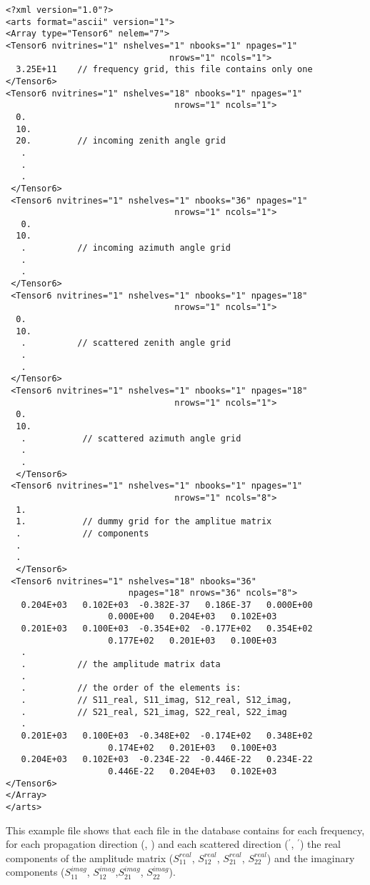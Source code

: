 \begin{verbatim}
<?xml version="1.0"?>
<arts format="ascii" version="1">
<Array type="Tensor6" nelem="7">
<Tensor6 nvitrines="1" nshelves="1" nbooks="1" npages="1"
                                nrows="1" ncols="1">
  3.25E+11    // frequency grid, this file contains only one
</Tensor6>
<Tensor6 nvitrines="1" nshelves="18" nbooks="1" npages="1" 
                                 nrows="1" ncols="1">
  0.          
  10.
  20.         // incoming zenith angle grid
   .
   .
   .
 </Tensor6>
 <Tensor6 nvitrines="1" nshelves="1" nbooks="36" npages="1"
                                 nrows="1" ncols="1">
   0.
  10.
   .          // incoming azimuth angle grid   
   .
   .
 </Tensor6>
 <Tensor6 nvitrines="1" nshelves="1" nbooks="1" npages="18"
                                 nrows="1" ncols="1">
  0.
  10.
   .          // scattered zenith angle grid
   .
   .
 </Tensor6>
 <Tensor6 nvitrines="1" nshelves="1" nbooks="1" npages="18"
                                 nrows="1" ncols="1">
  0.
  10.
   .           // scattered azimuth angle grid
   .
   .
  </Tensor6>
 <Tensor6 nvitrines="1" nshelves="1" nbooks="1" npages="1"
                                 nrows="1" ncols="8"> 
  1.
  1.           // dummy grid for the amplitue matrix 
  .            // components
  .
  .
  </Tensor6>
 <Tensor6 nvitrines="1" nshelves="18" nbooks="36" 
                        npages="18" nrows="36" ncols="8">
   0.204E+03   0.102E+03  -0.382E-37   0.186E-37   0.000E+00  
                    0.000E+00   0.204E+03   0.102E+03
   0.201E+03   0.100E+03  -0.354E+02  -0.177E+02   0.354E+02 
                    0.177E+02   0.201E+03   0.100E+03
   .
   .          // the amplitude matrix data 
   .    
   .          // the order of the elements is:
   .          // S11_real, S11_imag, S12_real, S12_imag, 
   .          // S21_real, S21_imag, S22_real, S22_imag    
   .
   0.201E+03   0.100E+03  -0.348E+02  -0.174E+02   0.348E+02  
                    0.174E+02   0.201E+03   0.100E+03
   0.204E+03   0.102E+03  -0.234E-22  -0.446E-22   0.234E-22   
                    0.446E-22   0.204E+03   0.102E+03
</Tensor6>
</Array>
</arts>
\end{verbatim}

This example file shows that each file in the database contains
for each frequency, for each propagation
direction (\ScaZa, \ScaAa) and each scattered direction
 (\ScaZa$^\prime$, \ScaAa$^\prime$) the real
components of the amplitude matrix ($S^{real}_{11}$, $S^{real}_{12}$,
$S^{real}_{21}$, $S^{real}_{22}$) and the imaginary components
($S^{imag}_{11}$, $S^{imag}_{12}$,$S^{imag}_{21}$, $S^{imag}_{22}$).

